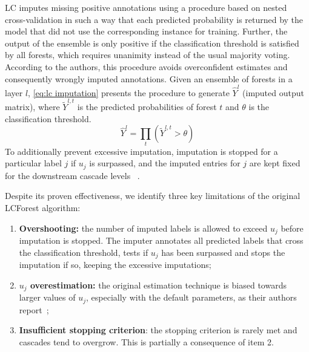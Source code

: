 \documentclass[conference,compsoc]{IEEEtran}
\begin{document}
LC imputes missing positive annotations using a procedure based on nested cross-validation in such a way that each predicted probability is returned by the model that did not use the corresponding instance for training.
Further, the output of the ensemble is only positive if the classification threshold is satisfied by all forests, which requires unanimity instead of the usual majority voting. According to the authors, this procedure avoids overconfident estimates and consequently wrongly imputed annotations. Given an ensemble of forests in a layer $l$, \autoref{eq:lc imputation} presents the procedure to generate $\hat Y^l$ (imputed output matrix), where $\tilde Y^{l,t}$ is the predicted probabilities of forest $t$ and $\theta$ is the classification threshold. 
%
\begin{equation}
    \hat Y^l = \prod_t (\tilde Y^{l, t} > \theta)
    \label{eq:lc imputation}
\end{equation}
%
To additionally prevent excessive imputation, imputation is stopped for a particular label $j$ if $u_j$ is surpassed, and the imputed entries for $j$ are kept fixed for the downstream cascade levels ~\cite{wang2020learning}. 

Despite its proven effectiveness, we identify three key limitations of the original LCForest algorithm:
%
\begin{enumerate}
    \item \textbf{Overshooting:} the number of imputed labels is allowed to exceed $u_j$ before imputation is stopped. The imputer annotates all predicted labels that cross the classification threshold, tests if $u_j$ has been surpassed and stops the imputation if so, keeping the excessive imputations;
    \item \textbf{$u_j$ overestimation:} the original estimation technique is biased towards larger values of $u_j$, especially with the default parameters, as their authors report~\cite{bekker2018estimating};%
    \item \textbf{Insufficient stopping criterion}: the stopping criterion is rarely met and cascades tend to overgrow. This is partially a consequence of item 2.
\end{enumerate}
%
\end{document}
